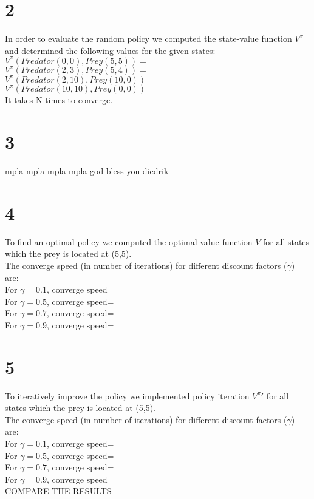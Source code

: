 \documentclass[letterpaper,11pt]{article}
\begin{document}
 

 \section*{2}
In order to evaluate the random policy we computed the state-value function $V^\pi$ and determined the following values for the given states:\\

$V^\pi(Predator(0,0),Prey(5,5))=$\\
$V^\pi(Predator(2,3),Prey(5,4))=$\\
$V^\pi(Predator(2,10),Prey(10,0))=$\\
$V^\pi(Predator(10,10),Prey(0,0))=$\\

It takes N times to converge.



 \section*{3}
mpla mpla mpla mpla god bless you diedrik

 \section*{4}
  To find an optimal policy we computed the optimal value function $V$ for all states which the prey is located at (5,5).\\
  The converge speed (in number of iterations) for different discount factors ($\gamma$) are:\\
  For $\gamma=0.1$, converge speed= \\
  For $\gamma=0.5$, converge speed= \\
  For $\gamma=0.7$, converge speed= \\
  For $\gamma=0.9$, converge speed= \\
  
  \section*{5}
  To iteratively improve the policy we implemented policy iteration $V^\pi\prime$ for all states which the prey is located at (5,5).\\
The converge speed (in number of iterations) for different discount factors ($\gamma$) are:\\
  For $\gamma=0.1$, converge speed= \\
  For $\gamma=0.5$, converge speed= \\
  For $\gamma=0.7$, converge speed= \\
  For $\gamma=0.9$, converge speed= \\
  
  COMPARE THE RESULTS
 

    
\end{document}
